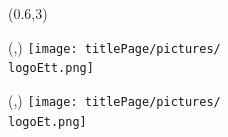 \begin{textblock}{1}(0.6,3)
    \Large{}
\end{textblock}
                            

\begin{textblock}{1}(\hpostt,\vpostt)
    \texttt{[image: titlePage/pictures/\\logoEtt.png]} 
\end{textblock}

\begin{textblock}{1}(\hpos,\vpos)
    \texttt{[image: titlePage/pictures/\\logoEt.png]}
\end{textblock}

